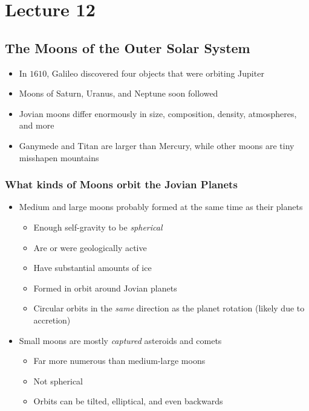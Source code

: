 \documentclass[class=article, crop=false]{standalone}
\begin{document}
  \section{Lecture 12}
  \subsection{The Moons of the Outer Solar System}
  \begin{itemize}
    \item In $1610$, Galileo discovered four objects that were orbiting Jupiter
    \item Moons of Saturn, Uranus, and Neptune soon followed 
    \item Jovian moons differ enormously in size, composition, density, atmospheres, and more
    \item Ganymede and Titan are larger than Mercury, while other moons are tiny misshapen mountains
  \end{itemize}
  \subsubsection{What kinds of Moons orbit the Jovian Planets}
  \begin{itemize}
    \item Medium and large moons probably formed at the same time as their planets
    \begin{itemize}
      \item Enough self-gravity to be \emph{spherical}
      \item Are or were geologically active
      \item Have substantial amounts of ice
      \item Formed in orbit around Jovian planets
      \item Circular orbits in the \emph{same} direction as the planet rotation (likely due to accretion)
    \end{itemize}
    \item Small moons are mostly \emph{captured} asteroids and comets
    \begin{itemize}
      \item Far more numerous than medium-large moons
      \item Not spherical
      \item Orbits can be tilted, elliptical, and even backwards
    \end{itemize}
  \end{itemize}
\end{document}
